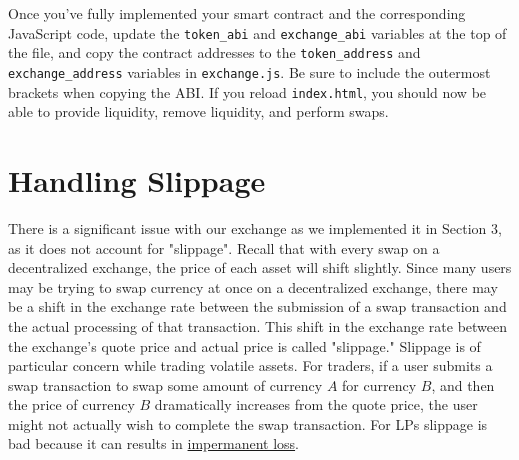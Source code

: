 \documentclass[11pt]{article}
\begin{document}
Once you've fully implemented your smart contract and the corresponding JavaScript code, update the \texttt{token\_abi} and \texttt{exchange\_abi} variables at the top of the file, and copy the contract addresses to the \texttt{token\_address} and \texttt{exchange\_address} variables in \texttt{exchange.js}. Be sure to include the outermost brackets when copying the ABI. If you reload \texttt{index.html}, you should now be able to provide liquidity, remove liquidity, and perform swaps.

 
\section{Handling Slippage}

There is a significant issue with our exchange as we implemented it in Section 3, as it does not account for "slippage". Recall that with every swap on a decentralized exchange, the price of each asset will shift slightly. Since many users may be trying to swap currency at once on a decentralized exchange, there may be a shift in the exchange rate between the submission of a swap transaction and the actual processing of that transaction. This shift in the exchange rate between the exchange's quote price and actual price is called "slippage." Slippage is of particular concern while trading volatile assets. For traders, if a user submits a swap transaction to swap some amount of currency $A$ for currency $B$, and then the price of currency $B$ dramatically increases from the quote price, the user might not actually wish to complete the swap transaction. For LPs slippage is bad because it can results in \href{https://finematics.com/impermanent-loss-explained/}{impermanent loss}.
\end{document}
